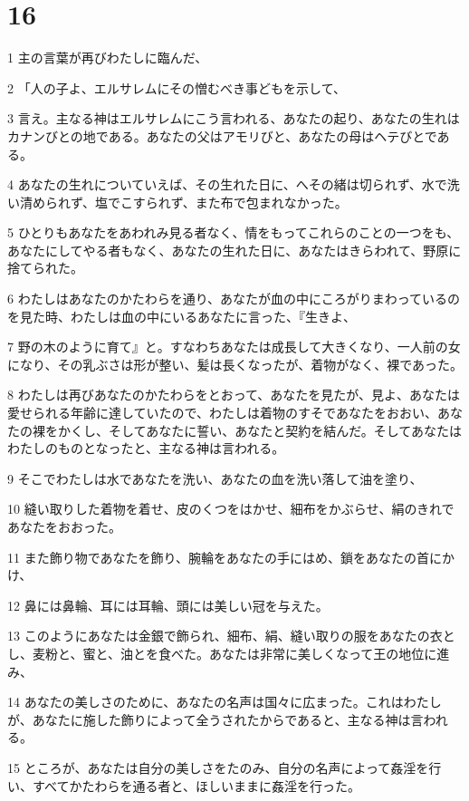 \chapter{16}

\par 1 主の言葉が再びわたしに臨んだ、
\par 2 「人の子よ、エルサレムにその憎むべき事どもを示して、
\par 3 言え。主なる神はエルサレムにこう言われる、あなたの起り、あなたの生れはカナンびとの地である。あなたの父はアモリびと、あなたの母はヘテびとである。
\par 4 あなたの生れについていえば、その生れた日に、へその緒は切られず、水で洗い清められず、塩でこすられず、また布で包まれなかった。
\par 5 ひとりもあなたをあわれみ見る者なく、情をもってこれらのことの一つをも、あなたにしてやる者もなく、あなたの生れた日に、あなたはきらわれて、野原に捨てられた。
\par 6 わたしはあなたのかたわらを通り、あなたが血の中にころがりまわっているのを見た時、わたしは血の中にいるあなたに言った、『生きよ、
\par 7 野の木のように育て』と。すなわちあなたは成長して大きくなり、一人前の女になり、その乳ぶさは形が整い、髪は長くなったが、着物がなく、裸であった。
\par 8 わたしは再びあなたのかたわらをとおって、あなたを見たが、見よ、あなたは愛せられる年齢に達していたので、わたしは着物のすそであなたをおおい、あなたの裸をかくし、そしてあなたに誓い、あなたと契約を結んだ。そしてあなたはわたしのものとなったと、主なる神は言われる。
\par 9 そこでわたしは水であなたを洗い、あなたの血を洗い落して油を塗り、
\par 10 縫い取りした着物を着せ、皮のくつをはかせ、細布をかぶらせ、絹のきれであなたをおおった。
\par 11 また飾り物であなたを飾り、腕輪をあなたの手にはめ、鎖をあなたの首にかけ、
\par 12 鼻には鼻輪、耳には耳輪、頭には美しい冠を与えた。
\par 13 このようにあなたは金銀で飾られ、細布、絹、縫い取りの服をあなたの衣とし、麦粉と、蜜と、油とを食べた。あなたは非常に美しくなって王の地位に進み、
\par 14 あなたの美しさのために、あなたの名声は国々に広まった。これはわたしが、あなたに施した飾りによって全うされたからであると、主なる神は言われる。
\par 15 ところが、あなたは自分の美しさをたのみ、自分の名声によって姦淫を行い、すべてかたわらを通る者と、ほしいままに姦淫を行った。
